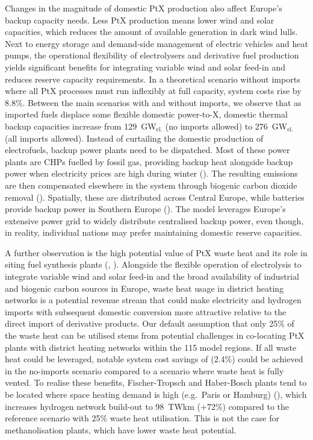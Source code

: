 
Changes in the magnitude of domestic PtX production also affect Europe's backup
capacity needs. Less PtX production means lower wind and solar capacities, which
reduces the amount of available generation in dark wind lulls. Next to energy
storage and demand-side management of electric vehicles and heat pumps, the
operational flexibility of electrolysers and derivative fuel production yields
significant benefits for integrating variable wind and solar feed-in and reduces
reserve capacity requirements. In a theoretical scenario without imports where
all PtX processes must run inflexibly at full capacity, system costs rise by
8.8\%. Between the main scenarios with and without imports, we observe that as
imported fuels displace some flexible domestic power-to-X, domestic thermal
backup capacities increase from 129~GW$_\text{el.}$ (no imports allowed) to
276~GW$_\text{el.}$ (all imports allowed). Instead of curtailing the domestic
production of electrofuels, backup power plants need to be dispatched. Most of
these power plants are CHPs fuelled by fossil gas, providing backup heat
alongside backup power when electricity prices are high during winter
(). The resulting emissions are then compensated
elsewhere in the system through biogenic carbon dioxide removal
(). Spatially, these are distributed across Central
Europe, while batteries provide backup power in Southern Europe
(). The model leverages Europe's extensive
power grid to widely distribute centralised backup power, even though, in
reality, individual nations may prefer maintaining domestic reserve capacities.


A further observation is the high potential value of PtX waste heat and
its role in siting fuel synthesis plants (,
). Alongside the flexible operation of electrolysis to
integrate variable wind and solar feed-in and the broad availability of
industrial and biogenic carbon sources in Europe, waste heat usage in district
heating networks is a potential revenue stream that could make electricity and
hydrogen imports with subsequent domestic conversion more attractive relative to
the direct import of derivative products. Our default assumption that only 25\%
of the waste heat can be utilised stems from potential challenges in co-locating
PtX plants with district heating networks within the 115 model regions. If all
waste heat could be leveraged, notable system cost savings of 
(2.4\%) could be achieved in the no-imports scenario compared to a scenario
where waste heat is fully vented. To realise these benefits, Fischer-Tropsch and
Haber-Bosch plants tend to be located where space heating demand is high
(e.g.~Paris or Hamburg) (), which increases hydrogen
network build-out to 98~TWkm (+72\%) compared to the reference scenario with
25\% waste heat utilisation. This is not the case for methanolisation plants,
which have lower waste heat potential.

